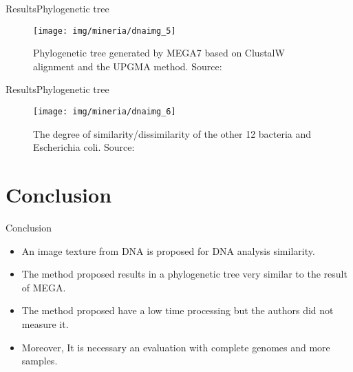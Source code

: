 \documentclass[10pt]{beamer}
\newcommand{\1}{
	\setbeamertemplate{background}{
		\texttt{[image: img/1\_dna]}
		\tikz[overlay] \fill[fill opacity=0.75,fill=white] (0,0) rectangle (-\paperwidth,\paperheight);
	}
}
\begin{document}
\begin{frame}{Results}{Phylogenetic tree}
	\begin{figure}[]
		\centering
		\texttt{[image: img/mineria/dnaimg\_5]}
		\label{img:mot2}
		\caption{Phylogenetic tree generated by MEGA7 based on ClustalW alignment and the UPGMA method. Source: \cite{delibacs2020dna} }
	\end{figure}	
\end{frame}


\begin{frame}{Results}{Phylogenetic tree}
	\begin{figure}[]
		\centering
		\texttt{[image: img/mineria/dnaimg\_6]}
		\label{img:mot2}
		\caption{The degree of similarity/dissimilarity of the other 12 bacteria and Escherichia
			coli. Source: \cite{delibacs2020dna} }
	\end{figure}	
\end{frame}


\section{Conclusion}

\begin{frame}{Conclusion}
	\begin{block}{}
		\begin{itemize}
			\item An image texture from DNA is proposed for DNA analysis similarity.
			\item The method proposed results in a phylogenetic tree very similar to the result of MEGA.
			\item The method proposed have a low time processing but the authors did not measure it.
			\item Moreover, It is necessary an evaluation with complete genomes and more samples.
		\end{itemize}
	\end{block}	
\end{frame}
\end{document}

